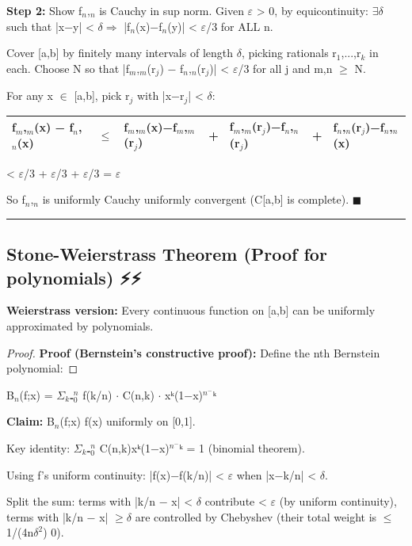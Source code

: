 \documentclass[12pt,a4paper,openany]{book}
\begin{document}
{{\textbf{Step 2:} Show {f$_n$,$_n$} is Cauchy in sup norm.
Given $\varepsilon$ > 0, by equicontinuity: $\exists\delta$ such that |x−y| < $\delta\Longrightarrow$ |f$_n$(x)−f$_n$(y)| < $\varepsilon$/3 for ALL n.

Cover [a,b] by finitely many intervals of length $\delta$, picking rationals r$_1$,...,r$_k$ in each.
Choose N so that |f$_m$,$_m$(r$_j$) − f$_n$,$_n$(r$_j$)| < $\varepsilon$/3 for all j and m,n $\geq$ N.

For any x $\in$ [a,b], pick r$_j$ with |x−r$_j$| < $\delta$:
\begin{center}
\begin{tabular}{|l|l|l|l|l|l|l|}
\hline
\textbf{f$_m$,$_m$(x) − f$_n$,$_n$(x)} & \textbf{$\leq$} & \textbf{f$_m$,$_m$(x)−f$_m$,$_m$(r$_j$)} & \textbf{+} & \textbf{f$_m$,$_m$(r$_j$)−f$_n$,$_n$(r$_j$)} & \textbf{+} & \textbf{f$_n$,$_n$(r$_j$)−f$_n$,$_n$(x)} \\
\hline
\end{tabular}
\end{center}
< $\varepsilon$/3 + $\varepsilon$/3 + $\varepsilon$/3 = $\varepsilon$

So {f$_n$,$_n$} is uniformly Cauchy  uniformly convergent (C[a,b] is complete). $\blacksquare$

\bigskip\noindent\rule{\textwidth}{0.4pt}\bigskip

\subsection{Stone-Weierstrass Theorem (Proof for polynomials) ⚡⚡}

\textbf{Weierstrass version:} Every continuous function on [a,b] can be uniformly approximated by polynomials.

\begin{proof}
\textbf{Proof (Bernstein's constructive proof):}
Define the nth Bernstein polynomial:
\end{proof}

B$_n$(f;x) = $\Sigma_k$₌$_0^n$ f(k/n) $\cdot$ C(n,k) $\cdot$ xᵏ(1−x)$^n^{-}$ᵏ

\textbf{Claim:} B$_n$(f;x)  f(x) uniformly on [0,1].

Key identity: $\Sigma_k$₌$_0^n$ C(n,k)xᵏ(1−x)$^n^{-}$ᵏ = 1 (binomial theorem).

Using f's uniform continuity: |f(x)−f(k/n)| < $\varepsilon$ when |x−k/n| < $\delta$.

Split the sum: terms with |k/n − x| < $\delta$ contribute < $\varepsilon$ (by uniform continuity), terms with |k/n − x| $\geq\delta$ are controlled by Chebyshev (their total weight is $\leq$ 1/(4n$\delta^2$)  0).

}}
\end{document}
